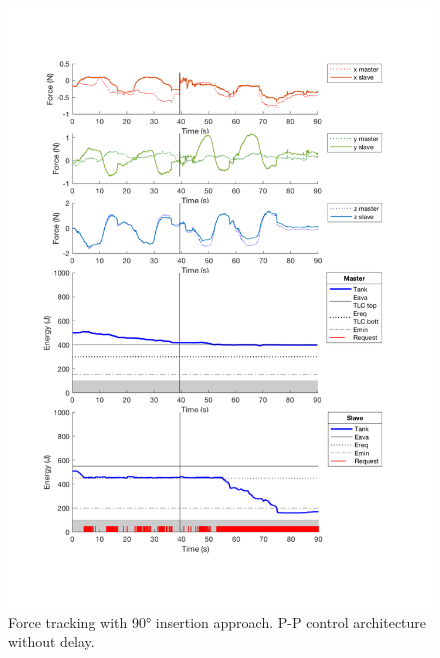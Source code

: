 \begin{center}
	\begin{figure}
		\includegraphics[width=\textwidth, keepaspectratio]{plots/pp90/Force.pdf}
		\caption{Force tracking with 90° insertion approach. P-P control architecture without delay.}
		\label{graph:pp90/Force}
	\end{figure}
\end{center}
\newpage
